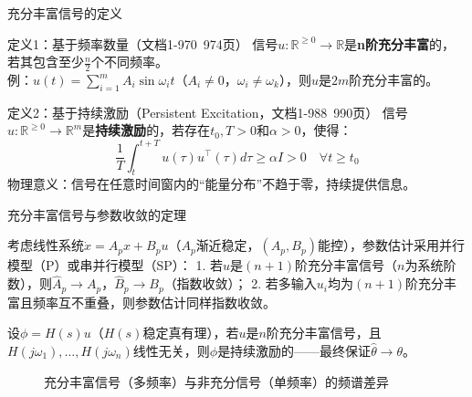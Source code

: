 \documentclass{beamer}
\begin{document}
\begin{frame}{充分丰富信号的定义}
  \begin{block}{定义1：基于频率数量（文档1-970~974页）}
    信号$u:\mathbb{R}^{\geq0}\to\mathbb{R}$是\textbf{n阶充分丰富}的，若其包含至少$\frac{n}{2}$个不同频率。\\
    例：$u(t)=\sum_{i=1}^m A_i\sin\omega_i t$（$A_i\neq0$，$\omega_i\neq\omega_k$），则$u$是$2m$阶充分丰富的。
  \end{block}

  \vspace{0.3cm}
  \begin{block}{定义2：基于持续激励（Persistent Excitation，文档1-988~990页）}
    信号$u:\mathbb{R}^{\geq0}\to\mathbb{R}^m$是\textbf{持续激励}的，若存在$t_0,T>0$和$\alpha>0$，使得：
    \[
    \frac{1}{T}\int_t^{t+T} u(\tau)u^\top(\tau)d\tau \geq \alpha I>0 \quad \forall t\geq t_0
    \]
    物理意义：信号在任意时间窗内的“能量分布”不趋于零，持续提供信息。
  \end{block}
\end{frame}

\begin{frame}{充分丰富信号与参数收敛的定理}
  \begin{theorem}[核心定理，文档1-991~1006页]
    考虑线性系统$\dot{x}=A_p x+B_p u$（$A_p$渐近稳定，$(A_p,B_p)$能控），参数估计采用并行模型（P）或串并行模型（SP）：
    1. 若$u$是$(n+1)$阶充分丰富信号（$n$为系统阶数），则$\hat{A}_p\to A_p$，$\hat{B}_p\to B_p$（指数收敛）；
    2. 若多输入$u_i$均为$(n+1)$阶充分丰富且频率互不重叠，则参数估计同样指数收敛。
  \end{theorem}

  \vspace{0.3cm}
  \begin{corollary}[回归向量与持续激励]
    设$\phi=H(s)u$（$H(s)$稳定真有理），若$u$是$n$阶充分丰富信号，且$H(j\omega_1),\dots,H(j\omega_n)$线性无关，则$\phi$是持续激励的——最终保证$\hat{\theta}\to\theta$。
  \end{corollary}

  \vspace{0.2cm}
  \begin{figure}
    \caption{充分丰富信号（多频率）与非充分信号（单频率）的频谱差异}
  \end{figure}
\end{frame}
\end{document}
